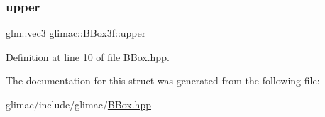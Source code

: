 \subsubsection{\texorpdfstring{upper}{upper}}
{\footnotesize\ttfamily \hyperlink{group__core__types_ga1c47e8b3386109bc992b6c48e91b0be7}{glm\+::vec3} glimac\+::\+B\+Box3f\+::upper}



Definition at line 10 of file B\+Box.\+hpp.



The documentation for this struct was generated from the following file\+:\begin{DoxyCompactItemize}
\item 
glimac/include/glimac/\hyperlink{_b_box_8hpp}{B\+Box.\+hpp}\end{DoxyCompactItemize}
